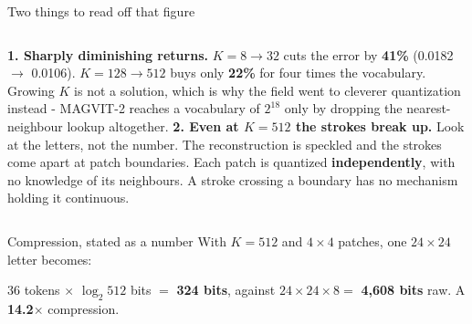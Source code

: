 \documentclass[aspectratio=169]{beamer}
\begin{document}
\begin{frame}{Two things to read off that figure}
  \small
  \begin{columns}[T]
    \textbf{1. Sharply diminishing returns.}
    \vskip 4pt
    \footnotesize
    $K{=}8 \rightarrow 32$ cuts the error by \textbf{41\%} (0.0182 $\rightarrow$ 0.0106).
    $K{=}128 \rightarrow 512$ buys only \textbf{22\%} for four times the vocabulary.
    \vskip 6pt
    Growing $K$ is not a solution, which is why the field went to cleverer quantization
    instead - MAGVIT-2 reaches a vocabulary of $2^{18}$ only by dropping the nearest-neighbour
    lookup altogether.
    \textbf{2. Even at $K{=}512$ the strokes break up.}
    \vskip 4pt
    \footnotesize
    Look at the letters, not the number. The reconstruction is speckled and the strokes come
    apart at patch boundaries.
    \vskip 6pt
    Each patch is quantized \textbf{independently}, with no knowledge of its neighbours. A
    stroke crossing a boundary has no mechanism holding it continuous.
  \end{columns}
  \vskip 8pt
\end{frame}

\begin{frame}{Compression, stated as a number}
  \small
  With $K = 512$ and $4\times4$ patches, one $24\times24$ letter becomes:
  \vskip 8pt
  \begin{center}
    36 tokens $\times$ $\log_2 512$ bits $=$ \textbf{324 bits}, against
    $24 \times 24 \times 8 = $ \textbf{4{,}608 bits} raw.
    \vskip 4pt
    A \textbf{14.2$\times$} compression.
  \end{center}
  \vskip 10pt
  \begin{columns}[T]
  \end{columns}
\end{frame}
\end{document}
